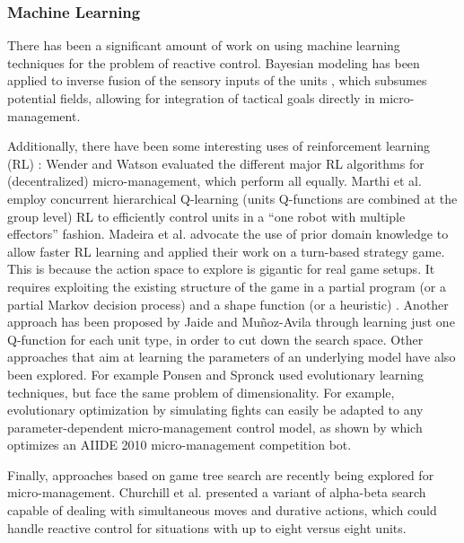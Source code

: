 \documentclass{llncs}
\begin{document}
\subsubsection{Machine Learning}
There has been a significant amount  of work on using machine learning
techniques for the problem of  reactive control. Bayesian modeling has
been applied  to inverse  fusion of  the sensory  inputs of  the units
\cite{SynnaeveMicroCig11}, which  subsumes potential  fields, allowing
for integration of tactical goals directly in micro-management.

Additionally, there  have been some interesting  uses of reinforcement
learning  (RL)   \cite{Sutton}:  Wender  and   Watson  \cite{WenderRL}
evaluated  the  different  major  RL  algorithms  for  (decentralized)
micro-management,    which   perform    all    equally.   Marthi    et
al. \cite{Marthi05}  employ concurrent hierarchical  Q-learning (units
Q-functions are combined at the group level) RL to efficiently control
units in a  ``one robot with multiple effectors''  fashion. Madeira et
al. \cite{Madeira06}  advocate the  use of  prior domain  knowledge to
allow  faster RL  learning  and  applied their  work  on a  turn-based
strategy game. This is because the action space to explore is gigantic
for real game setups. It requires exploiting the existing structure of
the game in  a partial program (or a partial  Markov decision process)
and  a  shape  function  (or  a  heuristic)  \cite{Marthi05}.  Another
approach   has   been   proposed    by   Jaide   and   Mu{\~n}oz-Avila
\cite{jaidee2012classq} through learning just  one Q-function for each
unit type,  in order to  cut down  the search space.  Other approaches
that aim at  learning the parameters of an underlying  model have also
been  explored.   For  example  Ponsen  and   Spronck  \cite{GA}  used
evolutionary  learning  techniques,  but  face  the  same  problem  of
dimensionality. For  example, evolutionary optimization  by simulating
fights   can   easily   be    adapted   to   any   parameter-dependent
micro-management control  model, as  shown by  \cite{OthmanSimu} which
optimizes an AIIDE 2010 micro-management competition bot.

Finally,  approaches based  on  game tree  search  are recently  being
explored        for        micro-management.       Churchill        et
al. \cite{churchill2012AIIDE} presented a variant of alpha-beta search
capable of dealing with simultaneous moves and durative actions, which
could handle reactive  control for situations with up  to eight versus
eight units.
\end{document}
